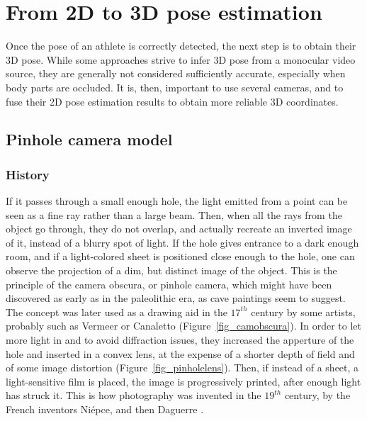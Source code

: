 \FloatBarrier
\section{From 2D to 3D pose estimation}\label{sec:3D reconstruction}
\label{ch:2.2}

Once the pose of an athlete is correctly detected, the next step is to obtain their 3D pose. While some approaches strive to infer 3D pose from a monocular video source, they are generally not considered sufficiently accurate, especially when body parts are occluded. It is, then, important to use several cameras, and to fuse their 2D pose estimation results to obtain more reliable 3D coordinates.


\subsection{Pinhole camera model}\label{subsec:Pinhole model}

\subsubsection{History}

If it passes through a small enough hole, the light emitted from a point can be seen as a fine ray rather than a large beam. Then, when all the rays from the object go through, they do not overlap, and actually recreate an inverted image of it, instead of a blurry spot of light. If the hole gives entrance to a dark enough room, and if a light-colored sheet is positioned close enough to the hole, one can observe the projection of a dim, but distinct image of the object. This is the principle of the camera obscura, or pinhole camera, which might have been discovered as early as in the paleolithic era, as cave paintings seem to suggest. The concept was later used as a drawing aid in the $17^{th}$ century by some artists, probably such as Vermeer or Canaletto \cite{Steadman2001} (Figure~\ref{fig_camobscura}). In order to let more light in and to avoid diffraction issues, they increased the apperture of the hole and inserted in a convex lens, at the expense of a shorter depth of field and of some image distortion (Figure~\ref{fig_pinholelens}). Then, if instead of a sheet, a light-sensitive film is placed, the image is progressively printed, after enough light has struck it. This is how photography was invented in the $19^{th}$ century, by the French inventors Niépce, and then Daguerre \cite{Marignier1999}.

